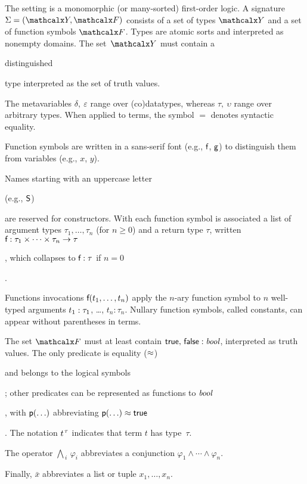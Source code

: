 \begin{conf}
\kern-2.9pt %
\end{conf}

The setting is a monomorphic (or many-sorted) first-order logic.
A signature $\Sig = (\Types, \Funcs)$ consists of a set of types $\Types$ and a
set of function symbols $\Funcs$. Types are atomic sorts and interpreted as
nonempty domains. The set~$\Types$ must contain a
\begin{rep}distinguished \end{rep}type  interpreted as the set of truth
values. %
\begin{rep}
The metavariables $\delta,\:\varepsilon$ range over (co)datatypes,
whereas $\tau,\:\upsilon$ range over arbitrary types.
When applied to terms, the symbol $=$ denotes syntactic equality.

Function symbols are written in a sans-serif font (e.g., $\textsf{f}$, $\textsf{g}$) to
distinguish them from variables (e.g., $x$, $y$).
\end{rep}
Names starting with an uppercase letter \begin{rep}(e.g.,
$\textsf{S}$) \end{rep}are reserved for constructors. With each function symbol 
is associated a list of argument types $\tau_1,\ldots,\tau_n$ (for $n \ge 0$)
and a return type $\tau$, written
$\textsf{f} : \tau_1 \times \cdots \times \tau_n \to \tau$\begin{rep},
which collapses to $\textsf{f} : \tau$ if $n = 0$\end{rep}.
\begin{rep}%
Functions invocations $\textsf{f}(t_1,\ldots,t_n)$
apply the $n$-ary function symbol
 to $n$ well-typed arguments $t_1 :\nobreak \tau_1$, \ldots, $t_n :
\tau_n$. Nullary function symbols, called constants, can appear without
parentheses in terms.
\end{rep}
The set $\Funcs$ must at least contain
$\textsf{true},\, \textsf{false} : \textit{bool}$, interpreted as truth values.
The only predicate is equality ($\approx$)\begin{rep} and belongs to the logical symbols\end{rep};
other predicates can be represented as functions to $\textit{bool}$\begin{rep},
with $\textsf{p}(\ldots)$ abbreviating $\textsf{p}(\ldots) \approx \textsf{true}$\end{rep}.
The notation $t\typ{\tau}$ indicates that term $t$ has type~$\tau$.
\begin{rep}The operator $\bigwedge_{\,i}\, \varphi_i$ abbreviates a conjunction
$\varphi_1 \mathrel\land \cdots \mathrel\land \varphi_n$. \end{rep}%
Finally, $\bar x$ abbreviates a list or tuple $x_1,\ldots,x_n$.

